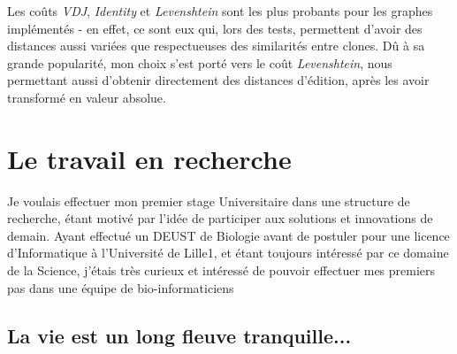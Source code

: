 \documentclass[pdftex,12pt,a4paper]{report}
\begin{document}
\begin{spacing}{1.2}
Les coûts \textit{VDJ}, \textit{Identity} et \textit{Levenshtein} sont les plus probants pour les graphes implémentés - en effet, ce sont eux qui, lors des tests, permettent d'avoir des distances aussi variées que respectueuses des similarités entre clones.
\newline
Dû à sa grande popularité, mon choix s'est porté vers le coût \textit{Levenshtein}, nous permettant aussi d'obtenir directement des distances d'édition, après les avoir transformé en valeur absolue.

\chapter{Le travail en recherche}

Je voulais effectuer mon premier stage Universitaire dans une structure de recherche, étant motivé par l'idée de participer aux solutions et innovations de demain. Ayant effectué un DEUST de Biologie avant de postuler pour une licence d'Informatique à l'Université de Lille1, et étant toujours intéressé par ce domaine de la Science, j'étais très curieux et intéressé de pouvoir effectuer mes premiers pas dans une équipe de bio-informaticiens

\section{La vie est un long fleuve tranquille...}


\end{spacing}
\end{document}
